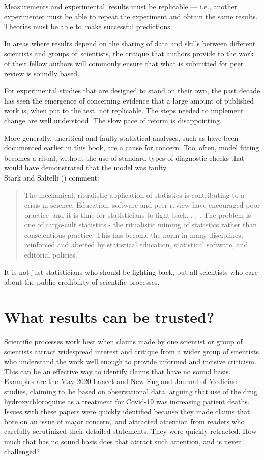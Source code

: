 \documentclass[
  10ptls,
  b5paper]{book}
\begin{document}
Measurements and experimental~results must be replicable
--- i.e., another experimenter must be able to repeat the
experiment and obtain the same results. Theories must
be able to~make successful predictions.

In areas where results depend on the sharing of data and
skills between different scientists and groups of~scientists,
the critique that authors provide to the work of their fellow
authors will commonly ensure that what is submitted for peer
review is soundly based.

For experimental studies that are designed to stand on
their own, the past decade has seen the emergence of
concerning evidence that a large amount of published
work is, when put to the test, not replicable. The
steps needed to implement change are well understood.
The slow pace of reform is disappointing.

More generally, uncritical and faulty statistical analyses,
such as have been documented earlier in this book, are a
cause for concern. Too~often, model fitting becomes a ritual,
without the use of standard types of diagnostic checks that
would have demonstrated that the model was faulty.\\
Stark and Saltelli () comment:

\begin{quote}
The mechanical, ritualistic application of statistics is contributing to a crisis in science. Education, software and peer review have encouraged poor practice--and it is time for statisticians to fight back.
. . .
The problem is one of cargo-cult statistics - the ritualistic miming of
statistics rather than conscientious practice. This has become the norm
in many disciplines, reinforced and abetted by statistical education,
statistical software, and editorial policies.
\end{quote}

It is not just statisticians who should be fighting back, but all
scientists who care about the public credibility of scientific
processes.

\section{What results can be trusted?}\label{what-results-can-be-trusted}

Scientific processes work best when claims made by one scientist
or group of scientists attract widespread interest and critique
from a wider group of scientists who understand the work well
enough to provide informed and incisive criticism. This can be
an effective way to identify claims that have no sound basis.
Examples are the May 2020 Lancet and New England Journal of
Medicine studies, claiming to~be based on observational data,
arguing that use of the drug hydroxychloroquine as a treatment
for Covid-19 was increasing patient deaths.\\
Issues with these papers were quickly identified because they
made claims that bore on an issue of major concern,~and attracted
attention from readers who carefully scrutinized their detailed
statements. They were quickly retracted. How much that has no
sound basis does that attract such attention, and is never
challenged?
\end{document}
